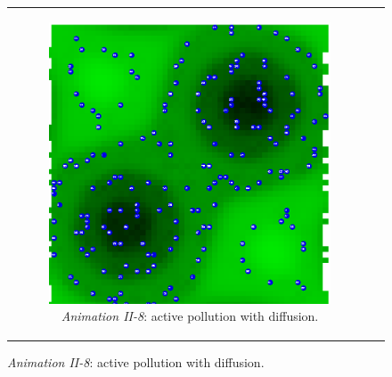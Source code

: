 \begin{figure}[H]
\begin{center}
\begin{tabular}{c c}
		\begin{subfigure}[b]{0.4\textwidth}
			\centering
			\includegraphics[width=1\textwidth, angle=0]{./fig/background/abs/sugarscape_pollution.png}
			\caption{\textit{Animation II-8}: active pollution with diffusion.}
			\label{fig:sugarscape_visualisation_pollution}
		\end{subfigure}
	\end{tabular}


\end{center}
\end{figure}
